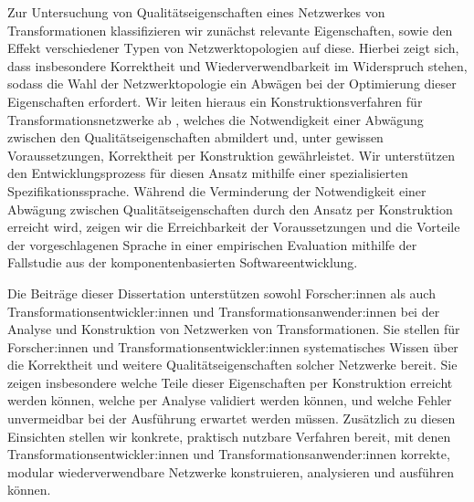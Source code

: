 Zur Untersuchung von Qualitätseigenschaften eines Netzwerkes von Transformationen klassifizieren wir zunächst relevante Eigenschaften, sowie den Effekt verschiedener Typen von Netzwerktopologien auf diese. %
Hierbei zeigt sich, dass insbesondere Korrektheit und Wiederverwendbarkeit im Widerspruch stehen, sodass die Wahl der Netzwerktopologie ein Abwägen bei der Optimierung dieser Eigenschaften erfordert.
Wir leiten hieraus ein Konstruktionsverfahren für Transformationsnetzwerke ab%
, welches die Notwendigkeit einer Abwägung zwischen den Qualitätseigenschaften abmildert und, unter gewissen Voraussetzungen, Korrektheit per Konstruktion gewährleistet. %
Wir unterstützen den Entwicklungsprozess für diesen Ansatz mithilfe einer spezialisierten Spezifikationssprache.
Während die Verminderung der Notwendigkeit einer Abwägung zwischen Qualitätseigenschaften durch den Ansatz per Konstruktion erreicht wird, zeigen wir die Erreichbarkeit der Voraussetzungen und die Vorteile der vorgeschlagenen Sprache in einer empirischen Evaluation mithilfe der Fallstudie aus der komponentenbasierten Softwareentwicklung. %

Die Beiträge dieser Dissertation unterstützen sowohl Forscher:innen als auch Transformationsentwickler:innen und Transformationsanwender:innen bei der Analyse und Konstruktion von Netzwerken von Transformationen. %
Sie stellen für Forscher:innen und Transformationsentwickler:innen systematisches Wissen über die Korrektheit und weitere Qualitätseigenschaften solcher Netzwerke bereit.
Sie zeigen insbesondere welche Teile dieser Eigenschaften per Konstruktion erreicht werden können, welche per Analyse validiert werden können, und welche Fehler unvermeidbar bei der Ausführung erwartet werden müssen.
Zusätzlich zu diesen Einsichten stellen wir konkrete, praktisch nutzbare Verfahren bereit, mit denen Transformationsentwickler:innen und Transformationsanwender:innen korrekte, modular wiederverwendbare Netzwerke konstruieren, analysieren und ausführen können.

